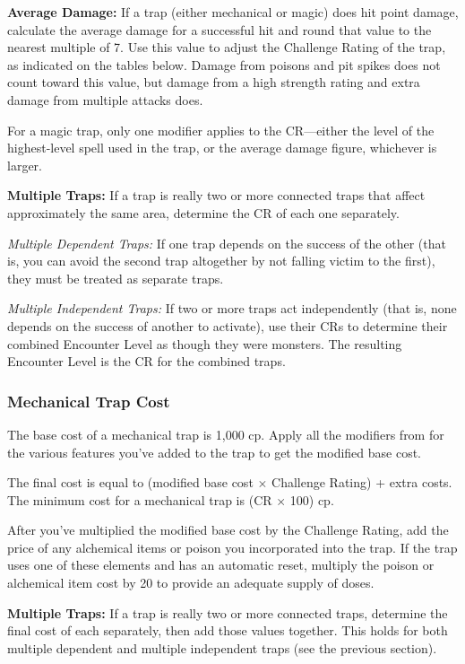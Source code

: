 \textbf{Average Damage:} If a trap (either mechanical or magic) does hit point damage, calculate the average damage for a successful hit and round that value to the nearest multiple of 7. Use this value to adjust the Challenge Rating of the trap, as indicated on the tables below. Damage from poisons and pit spikes does not count toward this value, but damage from a high strength rating and extra damage from multiple attacks does.

For a magic trap, only one modifier applies to the CR---either the level of the highest-level spell used in the trap, or the average damage figure, whichever is larger.

\textbf{Multiple Traps:} If a trap is really two or more connected traps that affect approximately the same area, determine the CR of each one separately.

\textit{Multiple Dependent Traps:} If one trap depends on the success of the other (that is, you can avoid the second trap altogether by not falling victim to the first), they must be treated as separate traps.

\textit{Multiple Independent Traps:} If two or more traps act independently (that is, none depends on the success of another to activate), use their CRs to determine their combined Encounter Level as though they were monsters. The resulting Encounter Level is the CR for the combined traps.

\subsubsection{Mechanical Trap Cost}
The base cost of a mechanical trap is 1,000 cp. Apply all the modifiers from  for the various features you've added to the trap to get the modified base cost.

The final cost is equal to (modified base cost $\times$ Challenge Rating) + extra costs. The minimum cost for a mechanical trap is (CR $\times$ 100) cp.

After you've multiplied the modified base cost by the Challenge Rating, add the price of any alchemical items or poison you incorporated into the trap. If the trap uses one of these elements and has an automatic reset, multiply the poison or alchemical item cost by 20 to provide an adequate supply of doses.

\textbf{Multiple Traps:} If a trap is really two or more connected traps, determine the final cost of each separately, then add those values together. This holds for both multiple dependent and multiple independent traps (see the previous section).

